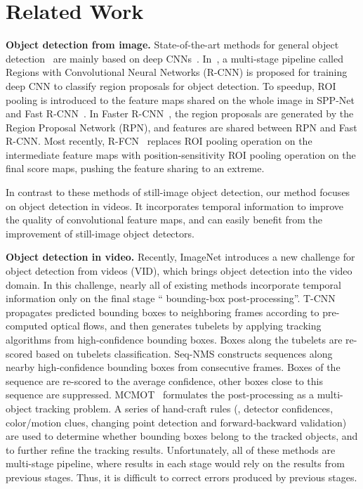 \documentclass[10pt,twocolumn,letterpaper]{article}
\begin{document}
\section{Related Work}

\textbf{Object detection from image.} State-of-the-art methods for general object detection~\cite{girshick2015fast,ren2015faster,liu2016ssd,dai2016rfcn} are mainly based on deep CNNs~\cite{krizhevsky2012imagenet,simonyan2015very,szegedy2015going,he2016deep}.
In~\cite{girshick2014rich}, a multi-stage pipeline called Regions with Convolutional Neural Networks (R-CNN) is proposed for training deep CNN to classify region proposals for object detection. To speedup, ROI pooling is introduced to the feature maps shared on the whole image in SPP-Net~\cite{he2014spatial} and Fast R-CNN~\cite{girshick2015fast}. In Faster R-CNN~\cite{ren2015faster}, the region proposals are generated by the Region Proposal Network (RPN), and features are shared between RPN and Fast R-CNN. Most recently, R-FCN~\cite{dai2016rfcn} replaces ROI pooling operation on the intermediate feature maps with position-sensitivity ROI pooling operation on the final score maps, pushing the feature sharing to an extreme.

In contrast to these methods of still-image object detection, our method focuses on object detection in videos. It incorporates temporal information to improve the quality of convolutional feature maps, and can easily benefit from the improvement of still-image object detectors.

\textbf{Object detection in video.} Recently, ImageNet introduces a new challenge for object detection from videos (VID), which brings object detection into the video domain. In this challenge, nearly all of existing methods incorporate temporal information only on the final stage `` bounding-box post-processing''. T-CNN~\cite{kang2016tcnn, kang2016object} propagates predicted bounding boxes to neighboring frames according to pre-computed optical flows, and then generates tubelets by applying tracking algorithms from high-confidence bounding boxes. Boxes along the tubelets are re-scored based on tubelets classification. Seq-NMS \cite{han2016seqnms} constructs sequences along nearby high-confidence bounding boxes from consecutive frames. Boxes of the sequence are re-scored to the average confidence, other boxes close to this sequence are suppressed. MCMOT~\cite{lee2016multi} formulates the post-processing as a multi-object tracking problem. A series of hand-craft rules (\eg, detector confidences, color/motion clues, changing point detection and forward-backward validation) are used to determine whether bounding boxes belong to the tracked objects, and to further refine the tracking results. Unfortunately, all of these methods are multi-stage pipeline, where results in each stage would rely on the results from previous stages. Thus, it is difficult to correct errors produced by previous stages.
\end{document}

